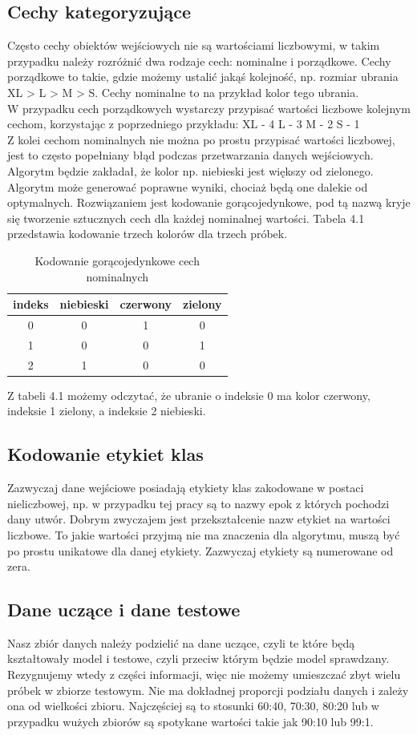 \documentclass[printmode, eng, openany]{mgr}
\newcommand\tab[1][1cm]{\hspace*{#1}}
\begin{document}
\subsection{Cechy kategoryzujące}
\tab Często cechy obiektów wejściowych nie są wartościami liczbowymi, w takim przypadku należy rozróżnić dwa rodzaje cech: nominalne i porządkowe. Cechy porządkowe to takie, gdzie możemy ustalić jakąś kolejność, np. rozmiar ubrania XL > L > M > S. Cechy nominalne to na przykład kolor tego ubrania.\\
\tab W przypadku cech porządkowych wystarczy przypisać wartości liczbowe kolejnym cechom, korzystając z poprzedniego przykładu:
XL - 4
L - 3
M - 2
S - 1\\
\tab Z kolei cechom nominalnych nie można po prostu przypisać wartości liczbowej, jest to często popełniany błąd podczas przetwarzania danych wejściowych. Algorytm będzie zakładał, że kolor np. niebieski jest większy od zielonego. Algorytm może generować poprawne wyniki, chociaż będą one dalekie od optymalnych. Rozwiązaniem jest kodowanie gorącojedynkowe, pod tą nazwą kryje się tworzenie sztucznych cech dla każdej nominalnej wartości. Tabela 4.1 przedstawia kodowanie trzech kolorów dla trzech próbek.
\begin{table}[H]
\centering
\caption{Kodowanie gorącojedynkowe cech nominalnych}
\begin{tabular}{c|c|c|c}

indeks & niebieski & czerwony & zielony \\
\hline
0 & 0 & 1 & 0 \\
\hline
1 & 0 & 0 & 1 \\
\hline
2 & 1 & 0 & 0 \\

\end{tabular}
\end{table}
Z tabeli 4.1 możemy odczytać, że ubranie o indeksie 0 ma kolor czerwony, indeksie 1 zielony, a indeksie 2 niebieski.
\subsection{Kodowanie etykiet klas}
\tab Zazwyczaj dane wejściowe posiadają etykiety klas zakodowane w postaci nieliczbowej, np. w przypadku tej pracy są to nazwy epok z których pochodzi dany utwór. Dobrym zwyczajem jest przekształcenie nazw etykiet na wartości liczbowe. To jakie wartości przyjmą nie ma znaczenia dla algorytmu, muszą być po prostu unikatowe dla danej etykiety. Zazwyczaj etykiety są numerowane od zera. 
\subsection{Dane uczące i dane testowe}
\tab Nasz zbiór danych należy podzielić na dane uczące, czyli te które będą kształtowały model i testowe, czyli przeciw którym będzie model sprawdzany. Rezygnujemy wtedy z części informacji, więc nie możemy umieszczać zbyt wielu próbek w zbiorze testowym. Nie ma dokładnej proporcji podziału danych i zależy ona od wielkości zbioru. Najczęściej są to stosunki 60:40, 70:30, 80:20 lub w przypadku wużych zbiorów są spotykane wartości takie jak 90:10 lub 99:1.
\end{document}
